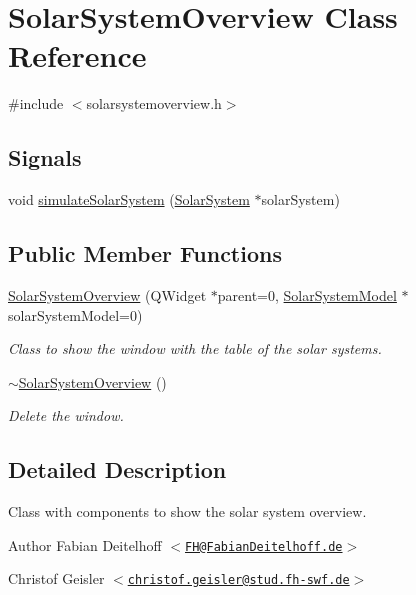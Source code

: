 \hypertarget{classSolarSystemOverview}{
\section{\-Solar\-System\-Overview \-Class \-Reference}
\label{df/d84/classSolarSystemOverview}
}


{\ttfamily \#include $<$solarsystemoverview.\-h$>$}

\subsection*{\-Signals}
\begin{DoxyCompactItemize}
\item 
void \hyperlink{classSolarSystemOverview_a3e4c6106618cf8f0fcf07f4b10961bf1}{simulate\-Solar\-System} (\hyperlink{classSolarSystem}{\-Solar\-System} $\ast$solar\-System)
\end{DoxyCompactItemize}
\subsection*{\-Public \-Member \-Functions}
\begin{DoxyCompactItemize}
\item 
\hyperlink{classSolarSystemOverview_accd156bc20db2e028b41cf2db7244cd2}{\-Solar\-System\-Overview} (\-Q\-Widget $\ast$parent=0, \hyperlink{classSolarSystemModel}{\-Solar\-System\-Model} $\ast$solar\-System\-Model=0)
\begin{DoxyCompactList}\small\item\em \-Class to show the window with the table of the solar systems. \end{DoxyCompactList}\item 
\hyperlink{classSolarSystemOverview_ace010f7bb05bd114b9fbddda91a3631f}{$\sim$\-Solar\-System\-Overview} ()
\begin{DoxyCompactList}\small\item\em \-Delete the window. \end{DoxyCompactList}\end{DoxyCompactItemize}


\subsection{\-Detailed \-Description}
\-Class with components to show the solar system overview.

\begin{DoxyAuthor}{\-Author}
\-Fabian \-Deitelhoff $<$\href{mailto:FH@FabianDeitelhoff.de}{\tt \-F\-H@\-Fabian\-Deitelhoff.\-de}$>$ 

\-Christof \-Geisler $<$\href{mailto:christof.geisler@stud.fh-swf.de}{\tt christof.\-geisler@stud.\-fh-\/swf.\-de}$>$ 
\end{DoxyAuthor}


